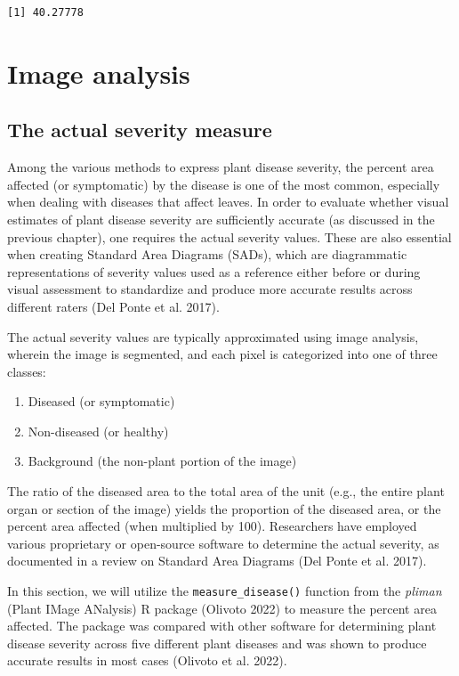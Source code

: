 \documentclass[
  letterpaper,
  DIV=11,
  numbers=noendperiod]{scrreprt}
\providecommand{\tightlist}{%
  \setlength{\itemsep}{0pt}\setlength{\parskip}{0pt}}\usepackage{longtable,booktabs,array}
\begin{document}
\begin{verbatim}
[1] 40.27778
\end{verbatim}

\hypertarget{image-analysis}{%
\chapter{Image analysis}\label{image-analysis}}

\hypertarget{the-actual-severity-measure}{%
\section{The actual severity
measure}\label{the-actual-severity-measure}}

Among the various methods to express plant disease severity, the percent
area affected (or symptomatic) by the disease is one of the most common,
especially when dealing with diseases that affect leaves. In order to
evaluate whether visual estimates of plant disease severity are
sufficiently accurate (as discussed in the previous chapter), one
requires the actual severity values. These are also essential when
creating Standard Area Diagrams (SADs), which are diagrammatic
representations of severity values used as a reference either before or
during visual assessment to standardize and produce more accurate
results across different raters (Del Ponte et al. 2017).

The actual severity values are typically approximated using image
analysis, wherein the image is segmented, and each pixel is categorized
into one of three classes:

\begin{enumerate}
\def\labelenumi{\arabic{enumi}.}
\tightlist
\item
  Diseased (or symptomatic)
\item
  Non-diseased (or healthy)
\item
  Background (the non-plant portion of the image)
\end{enumerate}

The ratio of the diseased area to the total area of the unit (e.g., the
entire plant organ or section of the image) yields the proportion of the
diseased area, or the percent area affected (when multiplied by 100).
Researchers have employed various proprietary or open-source software to
determine the actual severity, as documented in a review on Standard
Area Diagrams (Del Ponte et al. 2017).

In this section, we will utilize the \texttt{measure\_disease()}
function from the \emph{pliman} (Plant IMage ANalysis) R package
(Olivoto 2022) to measure the percent area affected. The package was
compared with other software for determining plant disease severity
across five different plant diseases and was shown to produce accurate
results in most cases (Olivoto et al. 2022).
\end{document}
